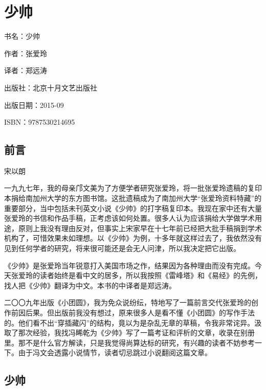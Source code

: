

\section{少帅}


\par 书名：少帅
\par 作者：张爱玲
\par 译者：郑远涛
\par 出版社：北京十月文艺出版社
\par 出版日期：2015-09
\par ISBN：9787530214695


\subsection{前言}

\begin{center}
    \par 宋以朗
\end{center}
\par 一九九七年，我的母亲邝文美为了方便学者研究张爱玲，将一批张爱玲遗稿的复印本捐给南加州大学的东方图书馆。这批遗稿成为了南加州大学“张爱玲资料特藏”的重要部分，当中包括未刊英文小说《少帅》的打字稿复印本。我现在家中还有大量张爱玲的书信和作品手稿，正考虑该如何处置。很多人认为应该捐给大学做学术用途，原则上我没有理由反对，但事实上宋家早在十七年前已经把大批手稿捐到学术机构了，可惜效果未如理想。以《少帅》为例，十多年就这样过去了，我依然没有见到任何学者的研究，将来很可能还是会无人问津，所以我决定把它出版。
\par 《少帅》是张爱玲当年锐意打入美国市场之作，结果因为各种理由而没有完成。今天张爱玲的读者始终是看中文的居多，所以我按照《雷峰塔》和《易经》的先例，找人把《少帅》翻译为中文。本书的中译者是郑远涛。
\par 二〇〇九年出版《小团圆》，我为免众说纷纭，特地写了一篇前言交代张爱玲的创作前因后果。但出版前我没有想过，原来很多人是看不懂《小团圆》的写作手法的。他们看不出“穿插藏闪”的结构，竟以为是杂乱无章的草稿，令我非常诧异。汲取了那次经验，我找冯睎乾为《少帅》写了一篇考证和评析的文章，收录在别册里。那不是什么官方解读，只是我觉得尚算达标的研究，有兴趣的读者不妨参考一下。由于冯文会透露小说情节，读者切忌跳过小说翻阅这篇文章。



\subsection{少帅}

